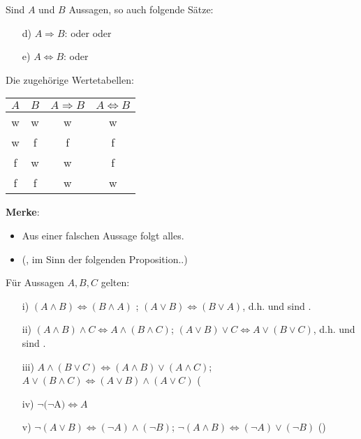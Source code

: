 \begin{defi}
	Sind $A$ und $B$ Aussagen, so auch folgende Sätze:
	\begin{itemize}
		\item[d)] $A\Rightarrow B$:  oder  oder 
		\item[e)] $A\Leftrightarrow B$:  oder 
	\end{itemize}
\end{defi} 
Die zugehörige Wertetabellen:
\begin{center}
	\begin{tabular}{|c|c|c|c|}
		\hline
		$A$ & $B$ & $A\Rightarrow B$ & $A\Leftrightarrow B$ \\
		\hline
		w & w & w & w \\
		w & f & f & f \\
		f & w & w & f \\
		f & f & w & w \\
		\hline
	\end{tabular}
\end{center}

\textbf{Merke}: 
\begin{itemize}
	\item Aus einer falschen Aussage folgt alles.
	\item {} (, im Sinn der folgenden Proposition..)
\end{itemize}

\begin{prop}
	Für Aussagen $A,B,C$ gelten:
	\begin{itemize}
		\item[i)] $(A\wedge B) \Leftrightarrow (B\wedge A)$ ; $(A\vee B) \Leftrightarrow (B\vee A)$, d.h.  und  sind .
		\item[ii)] $(A\wedge B)\wedge C \Leftrightarrow A\wedge (B\wedge C)$; $(A\vee B)\vee C\Leftrightarrow A\vee (B\vee C)$, d.h.  und  sind .
		\item[iii)] $A\wedge(B\vee C) \Leftrightarrow (A\wedge B)\vee(A\wedge C)$; $A\vee(B\wedge C) \Leftrightarrow (A\vee B)\wedge(A\vee C)$ (
		\item[iv)] $\neg(\neg$A$)\Leftrightarrow A$
		\item[v)] $\neg(A\vee B)\Leftrightarrow (\neg A)\wedge (\neg B)$; $\neg(A\wedge B) \Leftrightarrow (\neg A)\vee (\neg B)$ ()
	\end{itemize}
\end{prop}

